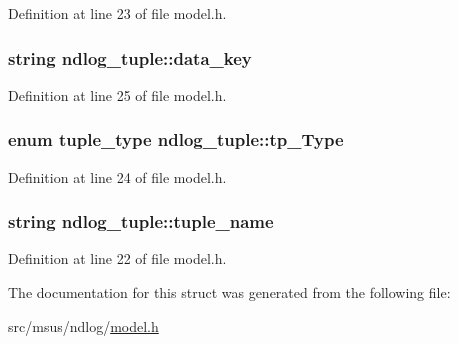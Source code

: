 Definition at line 23 of file model.\-h.

\hypertarget{structndlog__tuple_acd5e93ff19d18ae9eb60a29e2f66937c}{
\subsubsection[{data\-\_\-key}]{\setlength{\rightskip}{0pt plus 5cm}string ndlog\-\_\-tuple\-::data\-\_\-key}}\label{structndlog__tuple_acd5e93ff19d18ae9eb60a29e2f66937c}


Definition at line 25 of file model.\-h.

\hypertarget{structndlog__tuple_aa81437991ac9a764841242a8f82b1257}{
\subsubsection[{tp\-\_\-\-Type}]{\setlength{\rightskip}{0pt plus 5cm}enum {\bf tuple\-\_\-type} ndlog\-\_\-tuple\-::tp\-\_\-\-Type}}\label{structndlog__tuple_aa81437991ac9a764841242a8f82b1257}


Definition at line 24 of file model.\-h.

\hypertarget{structndlog__tuple_a60630913345afa409a56b2e612c9afea}{
\subsubsection[{tuple\-\_\-name}]{\setlength{\rightskip}{0pt plus 5cm}string ndlog\-\_\-tuple\-::tuple\-\_\-name}}\label{structndlog__tuple_a60630913345afa409a56b2e612c9afea}


Definition at line 22 of file model.\-h.



The documentation for this struct was generated from the following file\-:\begin{DoxyCompactItemize}
\item 
src/msus/ndlog/\hyperlink{model_8h}{model.\-h}\end{DoxyCompactItemize}

